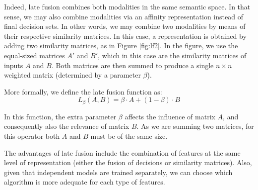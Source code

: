Indeed, late fusion combines both modalities in the same semantic space. In that sense,  we may also combine modalities via an affinity representation instead of final decision sets. In other words, we may combine two modalities  by means of their respective similarity matrices. In this case, a  representation is  obtained by adding  two similarity matrices, as in Figure \ref{fig:lf2}. In the figure, we use the equal-sized matrices $A\prime$ and $B\prime$, which in this case are the similarity matrices of inputs $A$ and $B$. Both matrices are then summed to produce a single $n \times n$ weighted matrix (determined by a parameter $\beta$). 
%

More formally, we define the late fusion function as:
\begin{equation} \label{eq:late-fusion}
L_\beta(A,B) = \beta \cdot A + (1 - \beta)\cdot B
\end{equation}

In this function, the extra parameter $\beta$ affects the influence of matrix $A$,  and consequently also the relevance of matrix $B$. As we are summing two matrices, for this operator both $A$ and $B$ must be of the same size.


The advantages of late fusion include the combination of features at the same level of representation (either the fusion of decisions or similarity matrices). Also, given that independent models are trained separately, we can choose which algorithm is more adequate for each type of features. 



